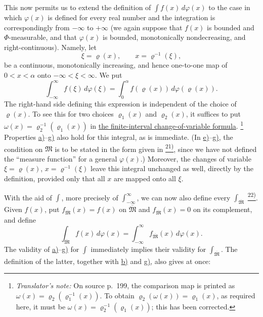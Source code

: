 \documentclass[12pt,b5paper,twoside]{article}
\newcommand{\noteref}[1]{%
  \hyperlink{note:#1}{\textsuperscript{#1)}}}
\newcommand{\translatorfootnote}[2]{%
  \begingroup
  \renewcommand{\thefootnote}{#1}%
  \footnote{\hspace{0.8em}\textit{Translator's note:} #2}%
  \endgroup}
\begin{document}
This now permits us to extend the definition of $\int f(x)\,d\varphi(x)$ to the case in which $\varphi(x)$ is defined for every real number and the integration is correspondingly from $-\infty$ to $+\infty$ (we again suppose that $f(x)$ is bounded and $\Phi$-measurable, and that $\varphi(x)$ is bounded, monotonically nondecreasing, and right-continuous). Namely, let
\[
 \xi=\varrho(x),\qquad x=\varrho^{-1}(\xi),
\]
be a continuous, monotonically increasing, and hence one-to-one map of $0<x<\alpha$ onto $-\infty<\xi<\infty$. We put
\label{eq:LS-definition-line}
\begin{equation*}
 \int_{-\infty}^{\infty}f(\xi)\,d\varphi(\xi)
 =\int_0^\alpha f(\varrho(x))\,d\varphi(\varrho(x)).
\end{equation*}
The right-hand side defining this expression is independent of the choice of $\varrho(x)$. To see this for two choices $\varrho_1(x)$ and $\varrho_2(x)$, it suffices to put $\omega(x)=\varrho_2^{-1}(\varrho_1(x))$ in \hyperref[eq:LS-change-finite]{the finite-interval change-of-variable formula}.\translatorfootnote{T2}{On source p.~199, the comparison map is printed as $\omega(x)=\varrho_2(\varrho_1^{-1}(x))$. To obtain $\varrho_2(\omega(x))=\varrho_1(x)$, as required here, it must be $\omega(x)=\varrho_2^{-1}(\varrho_1(x))$; this has been corrected.} Properties \hyperref[prop:I.4.a]{a)}--\hyperref[prop:I.4.g]{g)} also hold for this integral, as is immediate. (In \hyperref[prop:I.4.e]{e)}--\hyperref[prop:I.4.g]{g)}, the condition on $\mathfrak M$ is to be stated in the form given in \noteref{21}, since we have not defined the ``measure function'' for a general $\varphi(x)$.) Moreover, the changes of variable $\xi=\varrho(x)$, $x=\varrho^{-1}(\xi)$ leave this integral unchanged as well, directly by the definition, provided only that all $x$ are mapped onto all $\xi$.

With the aid of $\int$, more precisely of $\int_{-\infty}^{\infty}$, we can now also define every $\int_{\overline{\mathfrak M}}$\noteref{22}. Given $f(x)$, put $f_{\overline{\mathfrak M}}(x)=f(x)$ on $\overline{\mathfrak M}$ and $f_{\overline{\mathfrak M}}(x)=0$ on its complement, and define
\label{eq:LS-restricted}
\begin{equation*}
 \int_{\overline{\mathfrak M}}f(x)\,d\varphi(x)
 =\int_{-\infty}^{\infty}f_{\overline{\mathfrak M}}(x)\,d\varphi(x).
\end{equation*}
The validity of \hyperref[prop:I.4.a]{a)}--\hyperref[prop:I.4.g]{g)} for $\int$ immediately implies their validity for $\int_{\overline{\mathfrak M}}$. The definition of the latter, together with \hyperref[prop:I.4.b]{b)} and \hyperref[prop:I.4.g]{g)}, also gives at once:
\end{document}
